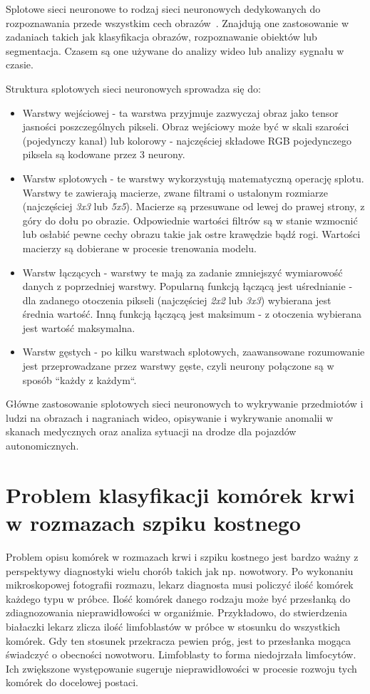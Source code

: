 Splotowe sieci neuronowe to rodzaj sieci neuronowych dedykowanych do rozpoznawania przede wszystkim cech obrazów~\cite{geron}.
Znajdują one zastosowanie w zadaniach takich jak klasyfikacja obrazów, rozpoznawanie obiektów lub segmentacja.
Czasem są one używane do analizy wideo lub analizy sygnału w czasie.

Struktura splotowych sieci neuronowych sprowadza się do:
\begin{itemize}
    \item Warstwy wejściowej - ta warstwa przyjmuje zazwyczaj obraz jako tensor jasności poszczególnych pikseli.
    Obraz wejściowy może być w skali szarości (pojedynczy kanał) lub kolorowy - najczęściej składowe RGB pojedynczego piksela są kodowane przez 3 neurony.
    \item Warstw splotowych - te warstwy wykorzystują matematyczną operację splotu.
    Warstwy te zawierają macierze, zwane filtrami o ustalonym rozmiarze (najczęściej \textit{3x3} lub \textit{5x5}).
    Macierze są przesuwane od lewej do prawej strony, z góry do dołu po obrazie.
    Odpowiednie wartości filtrów są w stanie wzmocnić lub osłabić pewne cechy obrazu takie jak ostre krawędzie bądź rogi.
    Wartości macierzy są dobierane w procesie trenowania modelu.
    \item Warstw łączących - warstwy te mają za zadanie zmniejszyć wymiarowość danych z poprzedniej warstwy.
    Popularną funkcją łączącą jest uśrednianie - dla zadanego otoczenia pikseli (najczęściej \textit{2x2} lub \textit{3x3}) wybierana jest średnia wartość.
    Inną funkcją łączącą jest maksimum - z otoczenia wybierana jest wartość maksymalna.
    \item Warstw gęstych - po kilku warstwach splotowych, zaawansowane rozumowanie jest przeprowadzane przez warstwy gęste, czyli neurony połączone są w sposób “każdy z każdym“.
\end{itemize}

Główne zastosowanie splotowych sieci neuronowych to wykrywanie przedmiotów i ludzi na obrazach i nagraniach wideo,
opisywanie i wykrywanie anomalii w skanach medycznych oraz analiza sytuacji na drodze dla pojazdów autonomicznych.


\section{Problem klasyfikacji komórek krwi w rozmazach szpiku kostnego}

Problem opisu komórek w rozmazach krwi i szpiku kostnego jest bardzo ważny z perspektywy diagnostyki wielu chorób takich jak np.
nowotwory.
Po wykonaniu mikroskopowej fotografii rozmazu, lekarz diagnosta musi policzyć ilość komórek każdego typu w próbce.
Ilość komórek danego rodzaju może być przesłanką do zdiagnozowania nieprawidłowości w organiźmie.
Przykładowo, do stwierdzenia białaczki lekarz zlicza ilość limfoblastów w próbce w stosunku do wszystkich komórek.
Gdy ten stosunek przekracza pewien próg, jest to przesłanka mogąca świadczyć o obecności nowotworu.
Limfoblasty to forma niedojrzała limfocytów.
Ich zwiększone występowanie sugeruje nieprawidłowości w procesie rozwoju tych komórek do docelowej postaci.

